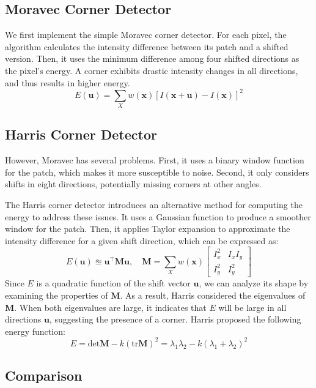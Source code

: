 \subsection{Moravec Corner Detector}

We first implement the simple Moravec corner detector. For each pixel, the 
algorithm calculates the intensity difference between its patch and a shifted 
version. Then, it uses the minimum difference among four shifted directions as 
the pixel's energy. A corner exhibits drastic intensity changes in all 
directions, and thus results in higher energy.
$$
  E(\mathbf{u}) = 
  \sum_{X} w(\mathbf{x}) [I(\mathbf x + \mathbf u) - I(\mathbf x)]^2
$$

\subsection{Harris Corner Detector}

However, Moravec has several problems. First, it uses a binary window function 
for the patch, which makes it more susceptible to noise. Second, it only 
considers shifts in eight directions, potentially missing corners at other angles.

The Harris corner detector introduces an alternative method for computing the 
energy to address these issues. It uses a Gaussian function to produce a 
smoother window for the patch. Then, it applies Taylor expansion to approximate 
the intensity difference for a given shift direction, which can be expressed as:
$$
  E(\mathbf{u}) \approxeq \mathbf{u}^\intercal\mathbf{M}\mathbf{u}, \quad 
  \mathbf{M} = \sum_{X} w(\mathbf x) \begin{bmatrix}
    I_x^2 & I_xI_y \\ I_y^2 & I_y^2
  \end{bmatrix}
$$
Since $E$ is a quadratic function of the shift vector $\mathbf{u}$, we can 
analyze its shape by examining the properties of $\mathbf{M}$. As a result, 
Harris considered the eigenvalues of $\mathbf{M}$. When both eigenvalues are 
large, it indicates that $E$ will be large in all directions $\mathbf{u}$, 
suggesting the presence of a corner. Harris proposed the following energy function:
$$  
  E = \mathrm{det}\mathbf{M} - k (\mathrm{tr}\mathbf{M})^2
  = \lambda_1\lambda_2 - k(\lambda_1 + \lambda_2)^2
$$

\subsection{Comparison}

